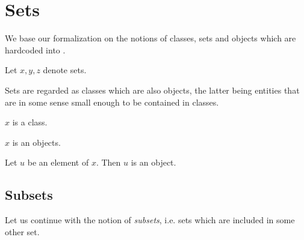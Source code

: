 \documentclass[../../set-theory.ftl.tex]{subfiles}
\begin{document}
  \section{Sets}

  \begin{forthel}
  \end{forthel}

  \begin{forthel}
  \end{forthel}

  \noindent We base our formalization on the notions of classes, sets and
  objects which are hardcoded into \Naproche.

  \begin{forthel}
    Let $x,y,z$ denote sets.
  \end{forthel}

  \noindent Sets are regarded as classes which are also objects, the latter
  being entities that are in some sense small enough to be contained in classes.

  \begin{forthel}
    \begin{axiom}\label{SetTheory_01_01_729563}
      $x$ is a class.
    \end{axiom}

    \begin{axiom}\label{SetTheory_01_01_603161}
      $x$ is an objects.
    \end{axiom}

    \begin{axiom}\label{SetTheory_01_01_617091}
      Let $u$ be an element of $x$.
      Then $u$ is an object.
    \end{axiom}
  \end{forthel}


  \subsection{Subsets}

  \noindent Let us continue with the notion of \textit{subsets}, i.e. sets
  which are included in some other set.
\end{document}
